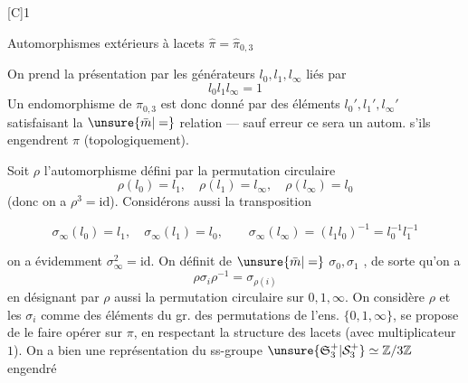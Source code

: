 [C]\qquad\textcircled{1}\qquad{}

Automorphismes extérieurs  à lacets   $\hat\pi=\hat\pi_{0,3}$
\margin{\unsure{$\partial$}}

On prend la présentation par les générateurs $l_0,l_1,l_\infty$ liés par
\[
l_0l_1l_\infty=1
\]
Un endomorphisme de $\pi_{0,3}$ est donc donné par des éléments $l_0',l_1',l_\infty'$ satisfaisant la $\unsure{\bar m|=}$ relation --- sauf erreur ce sera un autom. s'ils engendrent $\pi$ (topologiquement).

Soit $\rho$ l'automorphisme défini par la permutation circulaire
\[
\rho(l_0)=l_1,\quad\rho(l_1)=l_\infty,\quad\rho(l_\infty)=l_0
\]
(donc on a $\rho^3=\mathrm{id}$). Considérons aussi la transposition

\[
\sigma_\infty(l_0)=l_1,\quad\sigma_\infty(l_1)=l_0,\qquad
\sigma_\infty(l_\infty)=(l_1l_0)^{-1}=l_0^{-1}l_1^{-1}
\]

on a évidemment $\sigma_\infty^2=\mathrm{id}$. On définit de $\unsure{\bar m|=}$ $\sigma_0,\sigma_1$ , de sorte qu'on a
\[
\rho\sigma_i\rho^{-1}=\sigma_{\rho(i)}
\]
en désignant par $\rho$ aussi la permutation circulaire sur $0,1,\infty$. On considère $\rho$ et les $\sigma_i$ comme des éléments du gr.  des permutations de l'ens. $\{0,1,\infty\}$,  se propose de le faire opérer sur $\pi$, en respectant la structure des lacets (avec  multiplicateur $1$). On a bien une  représentation du ss-groupe $\unsure{\mathfrak S_3^+|\mathcal S_3^+}\simeq\mathbb Z/3\mathbb Z$ engendré
